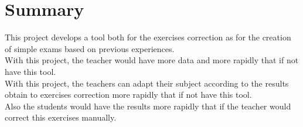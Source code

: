 

\chapter*{Summary}

This project develops a tool both for the exercises correction as for the creation of simple exams based on previous experiences.\\


With this project,  the teacher would have more data and more rapidly that if not have this tool.\\


With this project, the teachers can adapt their subject according to the results obtain to exercises correction more rapidly that if not have this tool.\\


Also the students would have the results more rapidly that if the teacher would correct this exercises manually.



